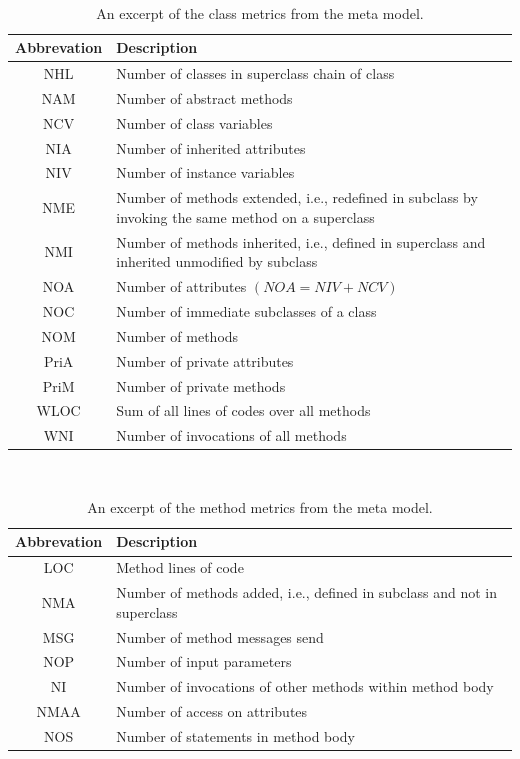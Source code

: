 \begin{table}
	\caption{An excerpt of the class metrics from the meta model.}~\label{tab:classmetrics}
	
	\setlength\tabcolsep{3pt}
	\renewcommand{\arraystretch}{1.4}%
	\begin{tabularx}{\columnwidth}{ | c | p{7cm} | }
		\hline
		Abbrevation & Description \\ \hline\hline
		NHL & Number of classes in superclass chain of class \\ \hline
		NAM & Number of abstract methods \\ \hline
		NCV & Number of class variables \\ \hline
		NIA & Number of inherited attributes \\ \hline
		NIV & Number of instance variables \\ \hline
		NME & Number of methods extended, i.e., redefined in subclass by invoking the same method on a superclass \\ \hline	
		NMI & Number of methods inherited, i.e., defined in superclass and inherited unmodified by subclass\\ \hline
		NOA & Number of attributes $(NOA = NIV + NCV)$ \\ \hline
		NOC & Number of immediate subclasses of a class \\ \hline
		NOM & Number of methods\\ \hline
		PriA & Number of private attributes \\ \hline
		PriM & Number of private methods \\ \hline
		WLOC & Sum of all lines of codes over all methods \\ \hline
		WNI & Number of invocations of all methods \\ \hline
	\end{tabularx}
\end{table}

\begin{table}
	\caption{An excerpt of the method metrics from the meta model.}~\label{tab:methodmetrics}
	
	\setlength\tabcolsep{3pt}
	\renewcommand{\arraystretch}{1.4}%
	\begin{tabularx}{\columnwidth}{ | c | p{7cm} | }
		\hline
		Abbrevation & Description \\ \hline\hline
		LOC & Method lines of code \\ \hline
		NMA & Number of methods added, i.e., defined in subclass and not in superclass \\ \hline
		MSG & Number of method messages send \\ \hline
		NOP & Number of input parameters \\ \hline
		NI & Number of invocations of other methods within method body \\ \hline
		NMAA & Number of access on attributes \\ \hline
		NOS & Number of statements in method body \\ \hline
	\end{tabularx}
\end{table}

